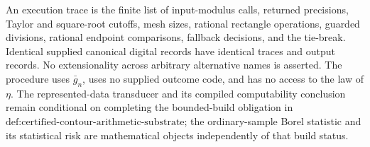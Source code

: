 An execution trace is the finite list of input-modulus calls, returned precisions, Taylor and square-root cutoffs, mesh sizes, rational rectangle operations, guarded divisions, rational endpoint comparisons, fallback decisions, and the tie-break.  Identical supplied canonical digital records have identical traces and output records.  No extensionality across arbitrary alternative names is asserted.  The procedure uses \(\bar g_n\), uses no supplied outcome code, and has no access to the law of \(\eta\).  The represented-data transducer and its compiled computability conclusion remain conditional on completing the bounded-build obligation in \(\text{def:certified-contour-arithmetic-substrate}\); the ordinary-sample Borel statistic and its statistical risk are mathematical objects independently of that build status.